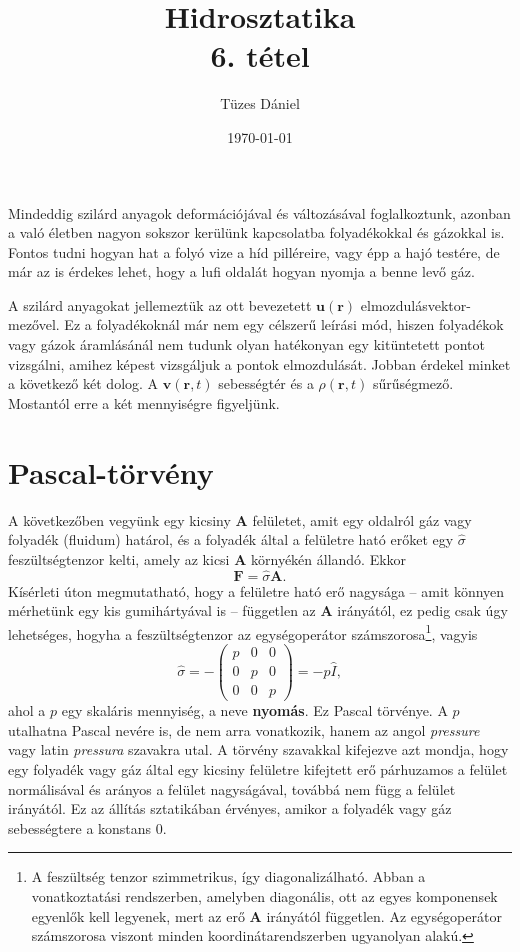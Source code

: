 \documentclass[12pt,a4paper]{scrartcl}
\title{Hidrosztatika\\{\small{6. tétel}}}
\author{Tüzes Dániel}
\date{\today}
\let\mathbf\bm
\begin{document}
\maketitle

Mindeddig szilárd anyagok deformációjával és változásával foglalkoztunk, azonban a való életben nagyon sokszor kerülünk kapcsolatba folyadékokkal és gázokkal is. Fontos tudni hogyan hat a folyó vize a híd pilléreire, vagy épp a hajó testére, de már az is érdekes lehet, hogy a lufi oldalát hogyan nyomja a benne levő gáz.

A szilárd anyagokat jellemeztük az ott bevezetett ${\mathbf{u}}\left( {\mathbf{r}} \right)$ elmozdulásvektor-mezővel. Ez a folyadékoknál már nem egy célszerű leírási mód, hiszen folyadékok vagy gázok áramlásánál nem tudunk olyan hatékonyan egy kitüntetett pontot vizsgálni, amihez képest vizsgáljuk a pontok elmozdulását. Jobban érdekel minket a következő két dolog. A ${\mathbf{v}}\left( {{\mathbf{r}},t} \right)$ sebességtér és a $\rho \left( {{\mathbf{r}},t} \right)$ sűrűségmező. Mostantól erre a két mennyiségre figyeljünk.

\section{Pascal-törvény}

A következőben vegyünk egy kicsiny ${\mathbf{A}}$ felületet, amit egy oldalról gáz vagy folyadék (fluidum) határol, és a folyadék által a felületre ható erőket egy $\hat \sigma$ feszültségtenzor kelti, amely az kicsi ${\mathbf{A}}$ környékén állandó. Ekkor 
\[{\mathbf{F}} = \hat \sigma {\mathbf{A}}.\]
Kísérleti úton megmutatható, hogy a felületre ható erő nagysága -- amit könnyen mérhetünk egy kis gumihártyával is -- független az ${\mathbf{A}}$ irányától, ez pedig csak úgy lehetséges, hogyha a feszültségtenzor az egységoperátor számszorosa\footnote{A feszültség tenzor szimmetrikus, így diagonalizálható. Abban a vonatkoztatási rendszerben, amelyben diagonális, ott az egyes komponensek egyenlők kell legyenek, mert az erő ${\mathbf{A}}$ irányától független. Az egységoperátor számszorosa viszont minden koordinátarendszerben ugyanolyan alakú.}, vagyis
\begin{equation} \label{eq:pascal}
\hat \sigma  =  - \left( {\begin{array}{*{20}{c}}
  p&0&0 \\ 
  0&p&0 \\ 
  0&0&p 
\end{array}} \right) =  - p\hat I,
\end{equation}
ahol a $p$ egy skaláris mennyiség, a neve \textbf{nyomás}. Ez Pascal törvénye. A $p$ utalhatna Pascal nevére is, de nem arra vonatkozik, hanem az angol \textit{pressure} vagy latin \textit{pressura} szavakra utal. A törvény szavakkal kifejezve azt mondja, hogy egy folyadék vagy gáz által egy kicsiny felületre kifejtett erő párhuzamos a felület normálisával és arányos a felület nagyságával, továbbá nem függ a felület irányától. Ez az állítás sztatikában érvényes, amikor a folyadék vagy gáz sebességtere a konstans 0.
\end{document}

